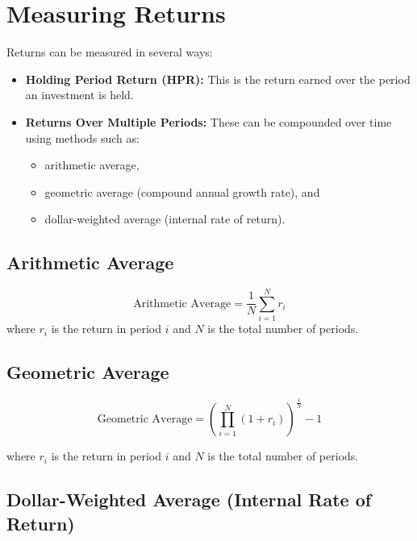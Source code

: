 \documentclass[
]{book}
\providecommand{\tightlist}{%
  \setlength{\itemsep}{0pt}\setlength{\parskip}{0pt}}
\begin{document}
\hypertarget{measuring-returns}{%
\section{Measuring Returns}\label{measuring-returns}}

Returns can be measured in several ways:

\begin{itemize}
\tightlist
\item
  \textbf{Holding Period Return (HPR):} This is the return earned over
  the period an investment is held.
\item
  \textbf{Returns Over Multiple Periods:} These can be compounded over
  time using methods such as:

  \begin{itemize}
  \tightlist
  \item
    arithmetic average,
  \item
    geometric average (compound annual growth rate), and
  \item
    dollar-weighted average (internal rate of return).
  \end{itemize}
\end{itemize}

\hypertarget{arithmetic-average}{%
\subsection{Arithmetic Average}\label{arithmetic-average}}

\[ \text{Arithmetic Average} = \frac{1}{N} \sum_{i=1}^{N} r_i \] where
\(r_i\) is the return in period \(i\) and \(N\) is the total number of
periods.

\hypertarget{geometric-average}{%
\subsection{Geometric Average}\label{geometric-average}}

\[ \text{Geometric Average} = \left( \prod_{i=1}^{N} (1 + r_i) \right)^{\frac{1}{N}} - 1 \]

where \(r_i\) is the return in period \(i\) and \(N\) is the total
number of periods.

\hypertarget{dollar-weighted-average-internal-rate-of-return}{%
\subsection{Dollar-Weighted Average (Internal Rate of
Return)}\label{dollar-weighted-average-internal-rate-of-return}}
\end{document}
